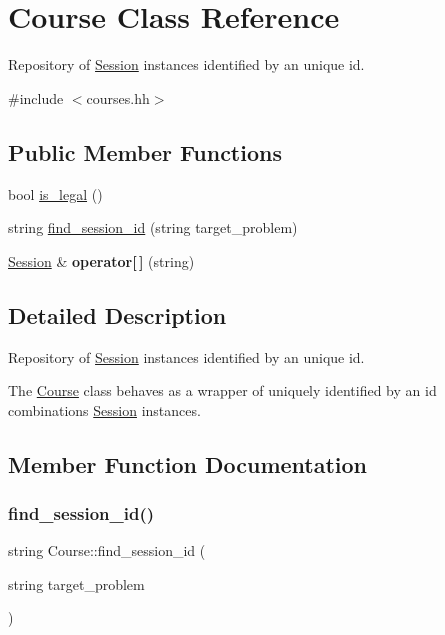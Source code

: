 \hypertarget{classCourse}{}\section{Course Class Reference}
\label{classCourse}


Repository of \hyperlink{classSession}{Session} instances identified by an unique id.  




{\ttfamily \#include $<$courses.\+hh$>$}

\subsection*{Public Member Functions}
\begin{DoxyCompactItemize}
\item 
bool \hyperlink{classCourse_a3e2bd434ae266de10601112d808f5e15}{is\+\_\+legal} ()
\item 
string \hyperlink{classCourse_a37e52d8c02455bccec118d3ca95b8496}{find\+\_\+session\+\_\+id} (string target\+\_\+problem)
\item 
\mbox{\label{classCourse_a92302590d57b2871c76b369b53404cfc}} 
\hyperlink{classSession}{Session} \& {\bfseries operator\mbox{[}$\,$\mbox{]}} (string)
\end{DoxyCompactItemize}


\subsection{Detailed Description}
Repository of \hyperlink{classSession}{Session} instances identified by an unique id. 

The \hyperlink{classCourse}{Course} class behaves as a wrapper of uniquely identified by an id combinations \hyperlink{classSession}{Session} instances. 

\subsection{Member Function Documentation}
\mbox{\label{classCourse_a37e52d8c02455bccec118d3ca95b8496}} 
\subsubsection{\texorpdfstring{find\+\_\+session\+\_\+id()}{find\_session\_id()}}
{\footnotesize\ttfamily string Course\+::find\+\_\+session\+\_\+id (\begin{DoxyParamCaption}\item[{string}]{target\+\_\+problem }\end{DoxyParamCaption})}


